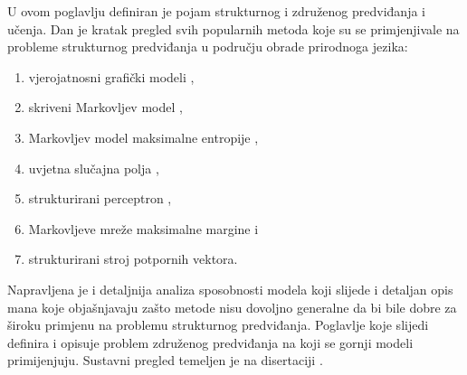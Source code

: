 U ovom poglavlju definiran je pojam strukturnog i združenog predviđanja i
učenja. Dan je kratak pregled svih popularnih metoda koje su se primjenjivale na
probleme strukturnog predviđanja u području obrade prirodnoga jezika:
\begin{enumerate}
  \item vjerojatnosni grafički modeli ,
    \item skriveni Markovljev model ,
    \item Markovljev model maksimalne entropije ,
    \item uvjetna slučajna polja ,
  \item strukturirani perceptron ,
  \item Markovljeve mreže maksimalne margine  i
  \item strukturirani stroj potpornih vektora.
\end{enumerate}
Napravljena je i detaljnija analiza sposobnosti modela koji slijede i detaljan
opis mana koje objašnjavaju zašto metode nisu dovoljno generalne da bi bile
dobre za široku primjenu na problemu strukturnog predviđanja. Poglavlje koje
slijedi definira i opisuje problem združenog predviđanja na koji se gornji
modeli primijenjuju. Sustavni pregled temeljen je na disertaciji
\citep{daume06thesis}.

